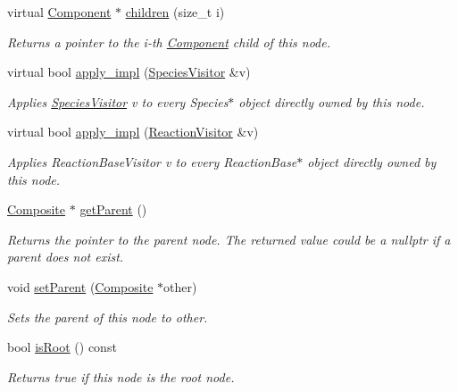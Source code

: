 \begin{DoxyCompactItemize}
virtual \hyperlink{classComponent}{Component} $\ast$ \hyperlink{classComposite_af2073a61c00153c28cab3a29926ea060}{children} (size\+\_\+t i)
\begin{DoxyCompactList}\small\item\em Returns a pointer to the i-\/th \hyperlink{classComponent}{Component} child of this node. \end{DoxyCompactList}\item 
virtual bool \hyperlink{classComponent_a20f6f5a1f7da3238c069dfc35f174a4b}{apply\+\_\+impl} (\hyperlink{classSpeciesVisitor}{Species\+Visitor} \&v)
\begin{DoxyCompactList}\small\item\em Applies \hyperlink{classSpeciesVisitor}{Species\+Visitor} v to every Species$\ast$ object directly owned by this node. \end{DoxyCompactList}\item 
virtual bool \hyperlink{classComponent_ac9296f41e0b9c254d5adea9df3b4b07a}{apply\+\_\+impl} (\hyperlink{classReactionVisitor}{Reaction\+Visitor} \&v)
\begin{DoxyCompactList}\small\item\em Applies Reaction\+Base\+Visitor v to every Reaction\+Base$\ast$ object directly owned by this node. \end{DoxyCompactList}\item 
\hyperlink{classComposite}{Composite} $\ast$ \hyperlink{classComponent_a4bb9041a7f3854f25f45060e81bb4e4e}{get\+Parent} ()
\begin{DoxyCompactList}\small\item\em Returns the pointer to the parent node. The returned value could be a nullptr if a parent does not exist. \end{DoxyCompactList}\item 
void \hyperlink{classComponent_a9d5b03697a653cda24d5688af1d105f8}{set\+Parent} (\hyperlink{classComposite}{Composite} $\ast$other)
\begin{DoxyCompactList}\small\item\em Sets the parent of this node to other. \end{DoxyCompactList}\item 
bool \hyperlink{classComponent_a4f0bed8144509d6565a30b548fac0fe7}{is\+Root} () const 
\begin{DoxyCompactList}\small\item\em Returns true if this node is the root node. \end{DoxyCompactList}\item 

\end{DoxyCompactItemize}
